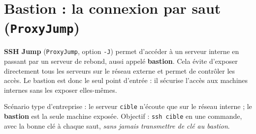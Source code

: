 \documentclass[a4paper,10pt]{exam}
\begin{document}
\section{Bastion : la connexion par saut (\texttt{ProxyJump})}

\textbf{SSH Jump} (\texttt{ProxyJump}, option \texttt{-J}) permet d'accéder à un serveur
interne en passant par un serveur de rebond, aussi appelé \textbf{bastion}. Cela évite
d'exposer directement tous les serveurs sur le réseau externe et permet de contrôler les
accès. Le bastion est donc le seul point d'entrée : il sécurise l'accès aux machines
internes sans les exposer elles-mêmes.

Scénario type d'entreprise : le serveur \texttt{cible} n'écoute que sur le réseau interne
; le \textbf{bastion} est la seule machine exposée. Objectif : \texttt{ssh cible} en une
commande, avec la bonne clé à chaque saut, \emph{sans jamais transmettre de clé au bastion}.
\end{document}

